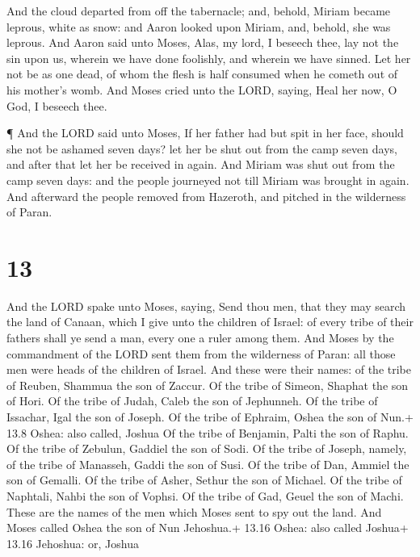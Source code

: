  And the cloud departed from off the tabernacle; and,
behold, Miriam became leprous, white as snow: and Aaron looked upon
Miriam, and, behold, she was leprous.  And Aaron said unto
Moses, Alas, my lord, I beseech thee, lay not the sin upon us, wherein
we have done foolishly, and wherein we have sinned.  Let
her not be as one dead, of whom the flesh is half consumed when he
cometh out of his mother's womb.  And Moses cried unto the
LORD, saying, Heal her now, O God, I beseech thee.

 ¶ And the LORD said unto Moses, If her father had but spit
in her face, should she not be ashamed seven days? let her be shut out
from the camp seven days, and after that let her be received in again.
 And Miriam was shut out from the camp seven days: and the
people journeyed not till Miriam was brought in again.  And
afterward the people removed from Hazeroth, and pitched in the
wilderness of Paran.

\hypertarget{section-12}{%
\section{13}\label{section-12}}

 And the LORD spake unto Moses, saying,  Send
thou men, that they may search the land of Canaan, which I give unto the
children of Israel: of every tribe of their fathers shall ye send a man,
every one a ruler among them.  And Moses by the commandment
of the LORD sent them from the wilderness of Paran: all those men were
heads of the children of Israel.  And these were their
names: of the tribe of Reuben, Shammua the son of Zaccur. 
Of the tribe of Simeon, Shaphat the son of Hori.  Of the
tribe of Judah, Caleb the son of Jephunneh.  Of the tribe of
Issachar, Igal the son of Joseph.  Of the tribe of Ephraim,
Oshea the son of Nun.+ 13.8 Oshea: also called, Joshua  Of
the tribe of Benjamin, Palti the son of Raphu.  Of the
tribe of Zebulun, Gaddiel the son of Sodi.  Of the tribe of
Joseph, namely, of the tribe of Manasseh, Gaddi the son of Susi.
 Of the tribe of Dan, Ammiel the son of Gemalli.
 Of the tribe of Asher, Sethur the son of Michael.
 Of the tribe of Naphtali, Nahbi the son of Vophsi.
 Of the tribe of Gad, Geuel the son of Machi. 
These are the names of the men which Moses sent to spy out the land. And
Moses called Oshea the son of Nun Jehoshua.+ 13.16 Oshea: also called
Joshua+ 13.16 Jehoshua: or, Joshua

